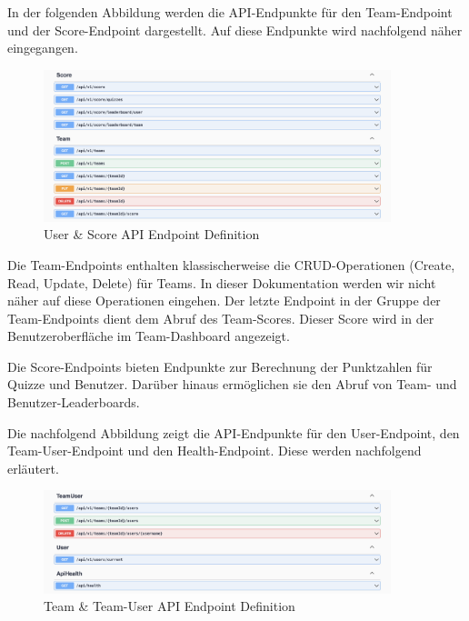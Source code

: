 \noindent In der folgenden Abbildung werden die API-Endpunkte für den Team-Endpoint und der Score-Endpoint dargestellt.
Auf diese Endpunkte wird nachfolgend näher eingegangen.

\begin{figure}[H]
  \centering
  \includegraphics[width=0.9\textwidth]{img/Score_Team-Endpoint.png}
  \caption{User \& Score API Endpoint Definition}
\end{figure}

\noindent Die Team-Endpoints enthalten klassischerweise die CRUD-Operationen (Create, Read, Update, Delete) für Teams. 
In dieser Dokumentation werden wir nicht näher auf diese Operationen eingehen. Der letzte Endpoint in der Gruppe der Team-Endpoints 
dient dem Abruf des Team-Scores. Dieser Score wird in der Benutzeroberfläche im Team-Dashboard angezeigt. \newline

\noindent Die Score-Endpoints bieten Endpunkte zur Berechnung der Punktzahlen für Quizze und Benutzer. 
Darüber hinaus ermöglichen sie den Abruf von Team- und Benutzer-Leaderboards. \newline

\noindent Die nachfolgend Abbildung zeigt die API-Endpunkte für den User-Endpoint, den Team-User-Endpoint und den Health-Endpoint.
Diese werden nachfolgend erläutert.

\begin{figure}[H]
  \centering
  \includegraphics[width=0.9\textwidth]{img/TeamUser_User-Endpoint.png}
  \caption{Team \& Team-User API Endpoint Definition}
\end{figure}

